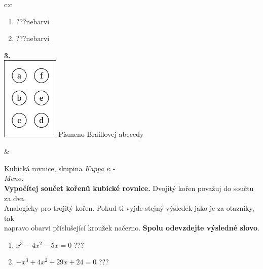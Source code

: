 \documentclass[10pt]{report}
\begin{document}
\begin{tabular}{c:c}
\begin{minipage}[c][99mm][t]{0.49\linewidth}
\begin{center}
\begin{minipage}{0.77\linewidth}
\begin{center}
\begin{varwidth}{\textwidth}
\begin{enumerate}
\item \quad \dotfill\; ???\;\dotfill \quad nebarvi
\item \quad \dotfill\; ???\;\dotfill \quad nebarvi
\end{enumerate}
\end{varwidth}
\end{center}
\end{minipage}
\begin{minipage}{0.20\linewidth}
\begin{center}
{\Huge\bfseries 3.} \\[2mm]
\includegraphics[height=40mm]{../images/braille.png}
{\small Písmeno Braillovej abecedy}
\end{center}
\end{minipage}
\end{center}
\end{minipage}
&
\begin{minipage}[c][99mm][t]{0.49\linewidth}
\begin{center}
\vspace{7mm}
{\huge Kubická rovnice, skupina \textit{Kappa $\kappa$} -}\\[4.5mm]
\textit{Meno:}\phantom{xxxxxxxxxxxxxxxxxxxxxxxxxxxxxxxxxxxxxxxxxxxxxxxxxxxxxxxxxxxxxxxxx}\\[3.5mm]
\textbf{Vypočítej součet kořenů kubické rovnice.} Dvojitý kořen považuj do součtu za dva.\\Analogicky pro trojitý kořen. Pokud ti vyjde stejný výsledek jako je za otazníky, tak\\napravo obarvi příslušející kroužek načerno. \textbf{Spolu odevzdejte výsledné slovo}.\\[3mm]
\begin{minipage}{0.77\linewidth}
\begin{center}
\begin{varwidth}{\textwidth}
\begin{enumerate}
\large
\item $x^3-4x^2-5x=0$\quad \dotfill\; ???\;\dotfill {}
\item $-x^3+4x^2+29x+24=0$\quad \dotfill\; ???\;\dotfill {}

\end{enumerate}
\end{varwidth}
\end{center}
\end{minipage}
\end{center}
\end{minipage}
\end{tabular}
\end{document}

